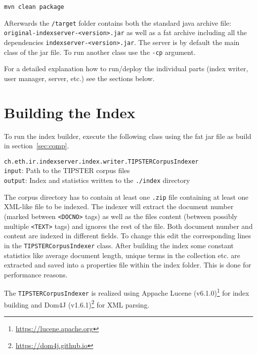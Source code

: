 \documentclass[a4paper,11pt]{article}
\begin{document}
\begin{leftbar}
\texttt{mvn clean package}
\end{leftbar}

Afterwards the \texttt{/target} folder contains both the standard java archive file: \texttt{original-indexserver-<version>.jar} as well as a fat archive including all the dependencies \texttt{indexserver-<version>.jar}. The server is by default the main class of the jar file. To run another class use the \texttt{-cp} argument.

For a detailed explanation how to run/deploy the individual parts (index writer, user manager, server, etc.) see the sections below.
\clearpage

\section{Building the Index}
To run the index builder, execute the following class using the fat jar file as build in section~\ref{sec:comp}.
\begin{leftbar}
\texttt{ch.eth.ir.indexserver.index.writer.TIPSTERCorpusIndexer}\\
\texttt{input}: Path to the TIPSTER corpus files\\
\texttt{output}: Index and statistics written to the \texttt{./index} directory
\end{leftbar}

The corpus directory has to contain at least one \texttt{.zip} file containing at least one XML-like file to be indexed. The indexer will extract the document number (marked between \texttt{<DOCNO>} tags) as well as the files content (between possibly multiple \texttt{<TEXT>} tags) and ignores the rest of the file. Both document number and content are indexed in different fields. To change this edit the corresponding lines in the \texttt{TIPSTERCorpusIndexer} class.
After building the index some constant statistics like average document length, unique terms in the collection etc. are extracted and saved into a properties file within the index folder. This is done for performance reasons.

The \texttt{TIPSTERCorpusIndexer} is realized using Appache Lucene (v6.1.0)\footnote{\url{https://lucene.apache.org}} for index building and Dom4J (v1.6.1)\footnote{\url{https://dom4j.github.io}} for XML parsing.
\end{document}
